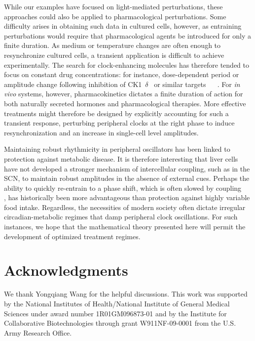 \documentclass[11pt, letterpaper]{article}
\providecommand{\DIFadd}[1]{{\protect\color{blue}#1}} %
\providecommand{\DIFdel}[1]{{\protect\color{red}}}                      %
\providecommand{\DIFaddbegin}{} %
\providecommand{\DIFaddend}{} %
\providecommand{\DIFdelbegin}{} %
\providecommand{\DIFdelend}{} %
\begin{document}
\DIFaddbegin \DIFadd{While our examples have focused on light-mediated perturbations, these approaches could also be applied to pharmacological perturbations.
Some difficulty arises in obtaining such data in cultured cells, however, as entraining perturbations would require that pharmacological agents be introduced for only a finite duration.
As medium or temperature changes are often enough to resynchronize cultured cells, a transient application is difficult to achieve experimentally.
The search for clock-enhancing molecules has therefore tended to focus on constant drug concentrations: for instance, dose-dependent period or amplitude change following inhibition of CK1\mbox{%
$\delta$
}%
or similar targets \mbox{%
\cite{Chen2013}
}%
.
For }{\itshape \DIFadd{in vivo}} \DIFadd{systems, however, pharmacokinetics dictates a finite duration of action for both naturally secreted hormones and pharmacological therapies.
More effective treatments might therefore be designed by explicitly accounting for such a transient response, perturbing peripheral clocks at the right phase to induce resynchronization and an increase in single-cell level amplitudes.
}

\DIFaddend Maintaining robust rhythmicity in peripheral oscillators has been linked to protection against metabolic disease.
It is therefore interesting that liver cells have not developed a stronger mechanism of intercellular coupling, such as in the SCN, to maintain robust amplitudes in the absence of external \DIFdelbegin \DIFdel{signalling}\DIFdelend \DIFaddbegin \DIFadd{cues}\DIFaddend .
Perhaps the ability to quickly re-entrain to a phase shift, which is often slowed by coupling \DIFaddbegin \DIFadd{\mbox{%
\cite{Abraham2010}
}%
}\DIFaddend , has historically been more advantageous than protection against highly variable food intake.
Regardless, the necessities of modern society often dictate irregular circadian-metabolic regimes that damp peripheral clock oscillations.
For such instances, we hope that the mathematical theory presented here will permit the development of optimized \DIFdelbegin \DIFdel{pharmacological or behavioral treatment regimesdesigned to boost peripheral
clock amplitude}\DIFdelend \DIFaddbegin \DIFadd{treatment regimes}\DIFaddend .

\section*{Acknowledgments}
We thank Yongqiang Wang for the helpful discussions.
This work was supported by the National Institutes of Health/National Institute of General Medical Sciences under award number 1R01GM096873-01 and by the Institute for Collaborative Biotechnologies through grant W911NF-09-0001 from the U.S.
Army Research Office.
\end{document}
